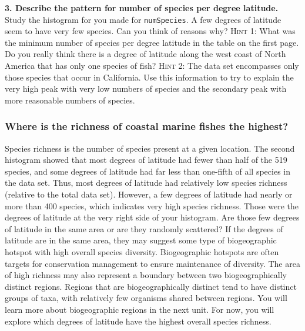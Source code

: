 \documentclass[11pt]{article}
\begin{document}
\vspace{5\baselineskip}

\textbf{3. Describe the pattern for number of species per degree latitude.} Study the histogram
for you made for \texttt{numSpecies}. A few
degrees of latitude seem to have very few species. Can you think of
reasons why? \textsc{Hint 1}: What was the minimum number of species per
degree latitude in the table on the first page. Do you really think
there is a degree of latitude along the west coast of North America that has only one
species of fish? \textsc{Hint 2}: The data set encompasses only those species
that occur in California. Use this information to try to explain the
very high peak with very low numbers of species and the secondary peak
with more reasonable numbers of species.

\newpage


\subsubsection*{Where is the richness of coastal marine fishes the highest?}

Species richness is the number of species present at a given location.
The second histogram showed that most degrees of latitude had fewer than
half of the 519 species, and some degrees of latitude had far less than
one-fifth of all species in the data set. Thus, most degrees of latitude
had relatively low species richness (relative to the total data set).
However, a few degrees of latitude had nearly or more than 400 species,
which indicates very high species richness. Those were the degrees of
latitude at the very right side of your histogram. Are those few degrees
of latitude in the same area or are they randomly scattered? If the
degrees of latitude are in the same area, they may suggest some type of
biogeographic hotspot with high overall species diversity. Biogeographic
hotspots are often targets for conservation management to ensure
maintenance of diversity. The area of high richness may also represent a
boundary between two biogeographically distinct regions. Regions that
are biogeographically distinct tend to have distinct groups of taxa,
with relatively few organisms shared between regions. You will learn
more about biogeographic regions in the next unit. For now, you will
explore which degrees of latitude have the highest overall species
richness.
\end{document}
